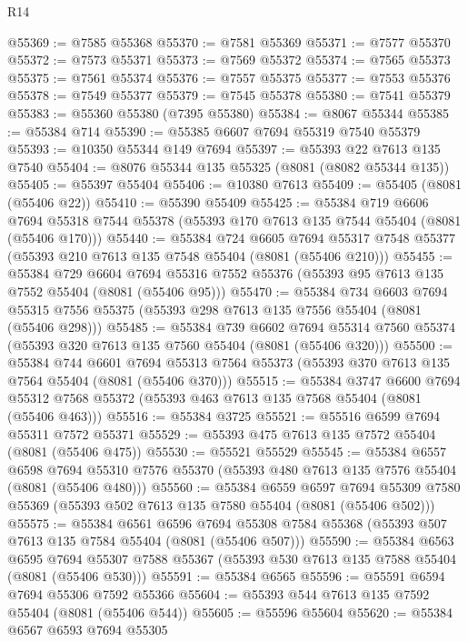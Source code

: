 \begin{lexlean}{R14}
\begin{coremodule}
@55369 := @7585 @55368
@55370 := @7581 @55369
@55371 := @7577 @55370
@55372 := @7573 @55371
@55373 := @7569 @55372
@55374 := @7565 @55373
@55375 := @7561 @55374
@55376 := @7557 @55375
@55377 := @7553 @55376
@55378 := @7549 @55377
@55379 := @7545 @55378
@55380 := @7541 @55379
@55383 := @55360 @55380 (@7395 @55380)
@55384 := @8067 @55344
@55385 := @55384 @714
@55390 := @55385 @6607 @7694 @55319 @7540 @55379
@55393 := @10350 @55344 @149 @7694
@55397 := @55393 @22 @7613 @135 @7540
@55404 := @8076 @55344 @135 @55325 (@8081 (@8082 @55344 @135))
@55405 := @55397 @55404
@55406 := @10380 @7613
@55409 := @55405 (@8081 (@55406 @22))
@55410 := @55390 @55409
@55425 := @55384
    @719
    @6606
    @7694
    @55318
    @7544
    @55378
    (@55393 @170 @7613 @135 @7544 @55404 (@8081 (@55406 @170)))
@55440 := @55384
    @724
    @6605
    @7694
    @55317
    @7548
    @55377
    (@55393 @210 @7613 @135 @7548 @55404 (@8081 (@55406 @210)))
@55455 := @55384
    @729
    @6604
    @7694
    @55316
    @7552
    @55376
    (@55393 @95 @7613 @135 @7552 @55404 (@8081 (@55406 @95)))
@55470 := @55384
    @734
    @6603
    @7694
    @55315
    @7556
    @55375
    (@55393 @298 @7613 @135 @7556 @55404 (@8081 (@55406 @298)))
@55485 := @55384
    @739
    @6602
    @7694
    @55314
    @7560
    @55374
    (@55393 @320 @7613 @135 @7560 @55404 (@8081 (@55406 @320)))
@55500 := @55384
    @744
    @6601
    @7694
    @55313
    @7564
    @55373
    (@55393 @370 @7613 @135 @7564 @55404 (@8081 (@55406 @370)))
@55515 := @55384
    @3747
    @6600
    @7694
    @55312
    @7568
    @55372
    (@55393 @463 @7613 @135 @7568 @55404 (@8081 (@55406 @463)))
@55516 := @55384 @3725
@55521 := @55516 @6599 @7694 @55311 @7572 @55371
@55529 := @55393 @475 @7613 @135 @7572 @55404 (@8081 (@55406 @475))
@55530 := @55521 @55529
@55545 := @55384
    @6557
    @6598
    @7694
    @55310
    @7576
    @55370
    (@55393 @480 @7613 @135 @7576 @55404 (@8081 (@55406 @480)))
@55560 := @55384
    @6559
    @6597
    @7694
    @55309
    @7580
    @55369
    (@55393 @502 @7613 @135 @7580 @55404 (@8081 (@55406 @502)))
@55575 := @55384
    @6561
    @6596
    @7694
    @55308
    @7584
    @55368
    (@55393 @507 @7613 @135 @7584 @55404 (@8081 (@55406 @507)))
@55590 := @55384
    @6563
    @6595
    @7694
    @55307
    @7588
    @55367
    (@55393 @530 @7613 @135 @7588 @55404 (@8081 (@55406 @530)))
@55591 := @55384 @6565
@55596 := @55591 @6594 @7694 @55306 @7592 @55366
@55604 := @55393 @544 @7613 @135 @7592 @55404 (@8081 (@55406 @544))
@55605 := @55596 @55604
@55620 := @55384
    @6567
    @6593
    @7694
    @55305

\end{coremodule}
\end{lexlean}
